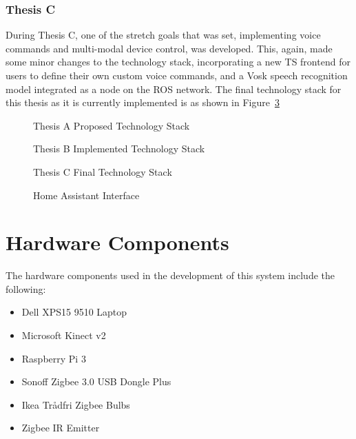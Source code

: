 \subsubsection{Thesis C}
During Thesis C, one of the stretch goals that was set, implementing voice commands and multi-modal device control, was developed.
This, again, made some minor changes to the technology stack, incorporating a new TS frontend for users to define their own custom voice commands, and a Vosk speech recognition model integrated as a node on the ROS network.
The final technology stack for this thesis as it is currently implemented is as shown in Figure~\ref{fig:tech_stack_thesis_c}

\begin{figure}[H]
    \caption{Thesis A Proposed Technology Stack}
    \label{fig:tech_stack_thesis_a}
\end{figure}

\begin{figure}[H]
    \caption{Thesis B Implemented Technology Stack}
    \label{fig:tech_stack_thesis_b}
\end{figure}

\begin{figure}[H]
    \caption{Thesis C Final Technology Stack}
    \label{fig:tech_stack_thesis_c}
\end{figure}

\begin{figure}[!htb]
    \caption{Home Assistant Interface}
    \label{fig:home_assistant}
\end{figure}

\section{Hardware Components}
The hardware components used in the development of this system include the following:
\begin{itemize}
    \item Dell XPS15 9510 Laptop
    \item Microsoft Kinect v2
    \item Raspberry Pi 3
    \item Sonoff Zigbee 3.0 USB Dongle Plus
    \item Ikea Trådfri Zigbee Bulbs
    \item Zigbee IR Emitter
\end{itemize}

